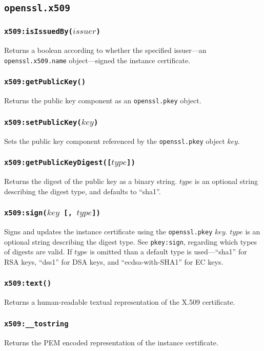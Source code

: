 \documentclass[11pt, oneside]{memoir}
\newcommand*{\fn}[1]{\texttt{#1}\xspace}
\newcommand*{\module}[1]{\texttt{#1}\xspace}
\newcounter{toccols}
\newenvironment{Module}[1]{
	\subsection{\texttt{#1}}
	\addtocontents{toc}{
		\protect\begin{multicols}{\value{toccols}}
	}
}{
	\addtocontents{toc}{\protect\end{multicols}}
}
\begin{document}
\begin{Module}{openssl.x509}
\subsubsection[\fn{x509:isIssuedBy}]{\fn{x509:isIssuedBy($issuer$)}}

Returns a boolean according to whether the specified issuer---an \module{openssl.x509.name} object---signed the instance certificate.

\subsubsection[\fn{x509:getPublicKey}]{\fn{x509:getPublicKey()}}

Returns the public key component as an \module{openssl.pkey} object.

\subsubsection[\fn{x509:setPublicKey}]{\fn{x509:setPublicKey($key$)}}

Sets the public key component referenced by the \module{openssl.pkey} object $key$.

\subsubsection[\fn{x509:getPublicKeyDigest}]{\fn{x509:getPublicKeyDigest([$type$])}}

Returns the digest of the public key as a binary string. $type$ is an optional string describing the digest type, and defaults to ``sha1''.

\subsubsection[\fn{x509:sign}]{\fn{x509:sign($key$ [, $type$])}}

Signs and updates the instance certificate using the \module{openssl.pkey} $key$. $type$ is an optional string describing the digest type. See \module{pkey:sign}, regarding which types of digests are valid. If $type$ is omitted than a default type is used---``sha1'' for RSA keys, ``dss1'' for DSA keys, and ``ecdsa-with-SHA1'' for EC keys.

\subsubsection[\fn{x509:text}]{\fn{x509:text()}}

Returns a human-readable textual representation of the X.509 certificate.

\subsubsection[\fn{x509:\_\_tostring}]{\fn{x509:\_\_tostring}}

Returns the PEM encoded representation of the instance certificate.

\end{Module}
\end{document}
